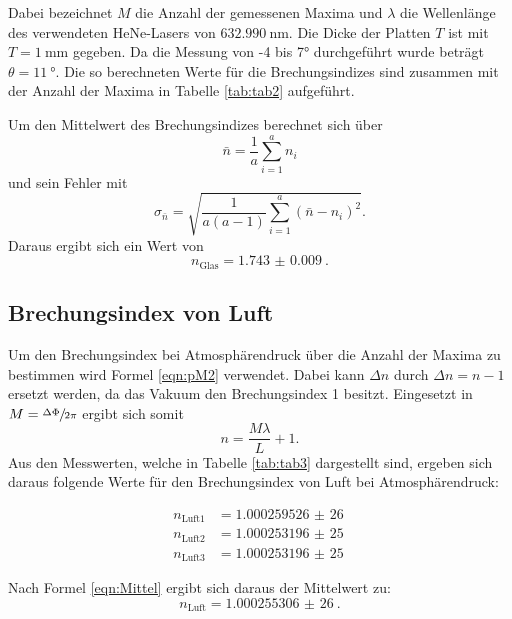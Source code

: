 Dabei bezeichnet $M$ die Anzahl der gemessenen Maxima und $\lambda$ die Wellenlänge des
verwendeten HeNe-Lasers von $\SI{632,990}{\nm}$. Die Dicke der Platten $T$ ist mit
$T=\SI{1}{\mm}$ gegeben. Da die Messung von -4 bis 7\:$\si{\degree}$ durchgeführt wurde beträgt
$\theta=\SI{11}{\degree}$. Die so berechneten Werte für die Brechungsindizes sind zusammen mit
der Anzahl der Maxima in Tabelle \ref{tab:tab2} aufgeführt.



Um den Mittelwert des Brechungsindizes berechnet sich über
\begin{equation}
  \bar{n}=\frac{1}{a}\sum_{i=1}^{a}n_i
  \label{eqn:Mittel}
\end{equation}
und sein Fehler mit
\begin{equation}
  \sigma_{\bar{n}}=\sqrt{\frac{1}{a(a-1)}\sum_{i=1}^{a}(\bar{n}-n_i)^2}.
  \label{eqn:Fehler}
\end{equation}
Daraus ergibt sich ein Wert von
\begin{equation}
  n_\text{Glas}=\SI{1.743(9)}{}.
\end{equation}

\subsection{Brechungsindex von Luft}

Um den Brechungsindex bei Atmosphärendruck über die Anzahl der Maxima zu bestimmen wird Formel \ref{eqn:pM2}
verwendet. Dabei kann $\Delta n$ durch  $\Delta n= n-1$ ersetzt werden, da das Vakuum den
Brechungsindex 1 besitzt. Eingesetzt in $M=\sfrac{\Delta\Phi}{2\pi}$ ergibt sich somit
\begin{equation}
  n=\frac{M\lambda}{L}+1.
  \label{eqn:nmax}
\end{equation}
Aus den Messwerten, welche in Tabelle \ref{tab:tab3} dargestellt sind, ergeben sich daraus folgende Werte für
den Brechungsindex von Luft bei Atmosphärendruck:

\begin{align*}
  n_\text{Luft1}&=\SI{1,000259526(26)}{}\\
  n_\text{Luft2}&=\SI{1,000253196(25)}{}\\
  n_\text{Luft3}&=\SI{1,000253196(25)}{}
\end{align*}

Nach Formel \ref{eqn:Mittel} ergibt sich daraus der Mittelwert zu:
\begin{equation*}
  n_\text{Luft}=\SI{1,000255306(26)}{}.
\end{equation*}

